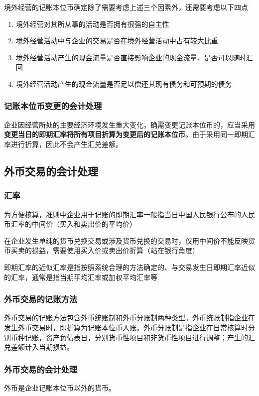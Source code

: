 \documentclass[UTF8,12pt]{ctexart}
\numberwithin{equation}{section} %
\numberwithin{figure}{section}
\numberwithin{table}{section}
\begin{document}
	境外经营的记账本位币确定除了需要考虑上述三个因素外，还需要考虑以下四点
	\begin{enumerate}
		\item 境外经营对其所从事的活动是否拥有很强的自主性
		
		\item 境外经营活动中与企业的交易是否在境外经营活动中占有较大比重
		
		\item 境外经营活动产生的现金流量是否直接影响企业的现金流量、是否可以随时汇回
		
		\item 境外经营活动产生的现金流量是否足以偿还其现有债务和可预期的债务
	\end{enumerate}
	
	
	\subsubsection{记账本位币变更的会计处理}
	企业因经营所处的主要经济环境发生重大变化，确需变更记账本位币的，应当采用\textbf{变更当日的即期汇率将所有项目折算为变更后的记账本位币}。由于采用同一即期汇率进行折算，因此不会产生汇兑差额。
	
	\subsection{外币交易的会计处理}
	\subsubsection{汇率}
	为方便核算，准则中企业用于记账的即期汇率一般指当日中国人民银行公布的人民币汇率的中间价（买入和卖出价的平均价）
	
	在企业发生单纯的货币兑换交易或涉及货币兑换的交易时，仅用中间价不能反映货币买卖的损益，需要使用买入价或卖出价折算（站在银行角度）
	
	即期汇率的近似汇率是指按照系统合理的方法确定的、与交易发生日即期汇率近似的汇率，通常是指当期平均汇率或加权平均汇率等
	
	\subsubsection{外币交易的记账方法}
	外币交易的记账方法包含外币统账制和外币分账制两种类型。外币统账制指企业在发生外币交易时，即折算为记账本位币入账。外币分账制是指企业在日常核算时分别币种记账，资产负债表日，分别货币性项目和非货币性项目进行调整；产生的汇兑差额计入当期损益。
	
	\subsubsection{外币交易的会计处理}
	外币是企业记账本位币以外的货币。
	
\end{document}
